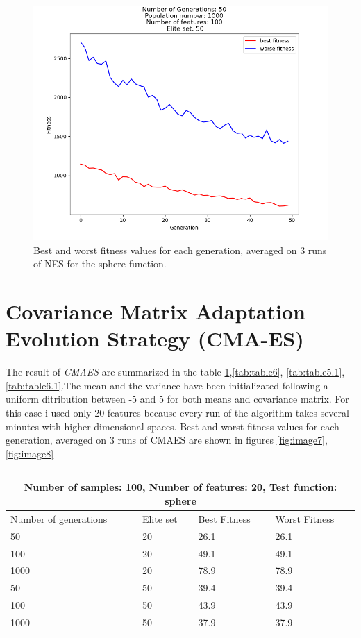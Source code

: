 \documentclass{article}
\begin{document}
\begin{figure}
	\centering
	\includegraphics[width=\textwidth]{NES_d_sphere.png}
	\caption{ Best and worst fitness values for each generation, averaged on 3 runs of NES for the sphere function.}
	\label{fig:image5}
\end{figure}


\section{Covariance Matrix Adaptation Evolution Strategy (CMA-ES)}
The result of  \textit{CMAES} are summarized in the table \ref{tab:table5},\ref{tab:table6}, \ref{tab:table5.1}, \ref{tab:table6.1}.The mean and the variance have been initializated following a uniform ditribution between -5 and 5 for both means and covariance matrix. For this case i used only 20 features because every run of the algorithm takes several minutes with higher dimensional spaces.  Best and worst fitness values for each generation, averaged on 3 runs of CMAES are shown in figures \ref{fig:image7},  \ref{fig:image8} \\

\begin{table}[h]
\begin{tabular}{ |p{3cm}||p{3cm}|p{3cm}|p{3cm}|  }
	\hline
	\multicolumn{4}{|c|}{Number of samples: 100,  Number of features: 20, Test function: sphere} \\
	\hline
	Number of generations& Elite set & Best Fitness & Worst Fitness\\
	\hline
	50   & 20    &26.1& 26.1\\
	100 &   20  & 49.1   & 49.1\\
	1000 & 20 & 78.9&  78.9\\
	50    &50 & 39.4& 39.4\\
	100&   50  &43.9& 43.9\\
	1000& 50  & 37.9   &37.9\\
	
	\hline
\end{tabular} 
\caption{\label{tab:table5} }
\end{table}
\end{document}
